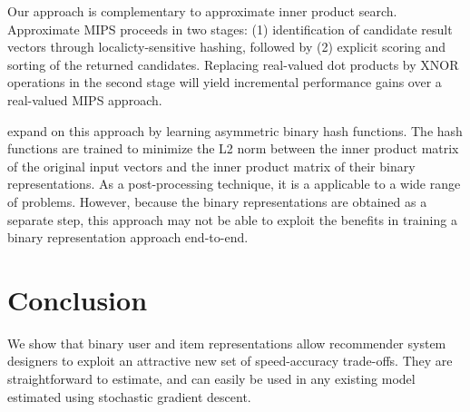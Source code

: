 \documentclass[sigchi]{acmart}
\begin{document}
Our approach is complementary to approximate inner product search. Approximate MIPS proceeds in two stages: (1) identification of candidate result vectors through localicty-sensitive hashing, followed by (2) explicit scoring and sorting of the returned candidates. Replacing real-valued dot products by XNOR operations in the second stage will yield incremental performance gains over a real-valued MIPS approach.

\citet{Shen_2015_ICCV} expand on this approach by learning asymmetric binary hash functions. The hash functions are trained to minimize the L2 norm between the inner product matrix of the original input vectors and the inner product matrix of their binary representations. As a post-processing technique, it is a applicable to a wide range of problems. However, because the binary representations are obtained as a separate step, this approach may not be able to exploit the benefits in training a binary representation approach end-to-end.

\section{Conclusion}
We show that binary user and item representations allow recommender system designers to exploit an attractive new set of speed-accuracy trade-offs. They are straightforward to estimate, and can easily be used in any existing model estimated using stochastic gradient descent.




\end{document}
